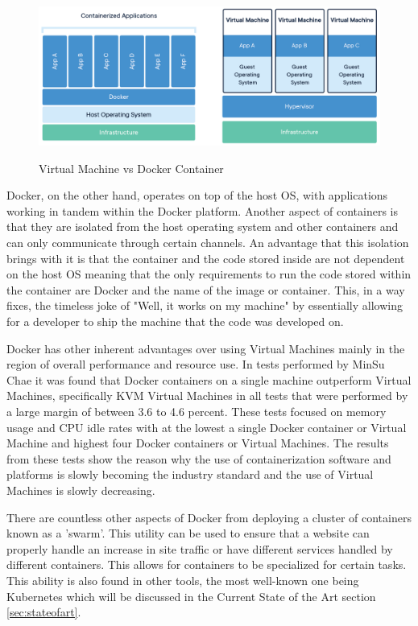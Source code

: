 \begin{figure}[h!]
    \centering
    \includegraphics[width=5in]{images/Docker1}
    \caption{Virtual Machine vs Docker Container}
    \cite{dockerContainer}
\end{figure}

Docker, on the other hand, operates on top of the host OS, with applications working in tandem within the Docker platform. Another aspect of containers is that they are isolated from the host operating system and other containers and can only communicate through certain channels. An advantage that this isolation brings with it is that the container and the code stored inside are not dependent on the host OS meaning that the only requirements to run the code stored within the container are Docker and the name of the image or container. This, in a way fixes, the timeless joke of "Well, it works on my machine" by essentially allowing for a developer to ship the machine that the code was developed on.

Docker has other inherent advantages over using Virtual Machines mainly in the region of overall performance and resource use. In tests performed by MinSu Chae \cite{chae2019performance} it was found that Docker containers on a single machine outperform Virtual Machines, specifically KVM Virtual Machines in all tests that were performed by a large margin of between 3.6 to 4.6 percent. These tests focused on memory usage and CPU idle rates with at the lowest a single Docker container or Virtual Machine and highest four Docker containers or Virtual Machines. The results from these tests show the reason why the use of containerization software and platforms is slowly becoming the industry standard and the use of Virtual Machines is slowly decreasing.

There are countless other aspects of Docker from deploying a cluster of containers known as a 'swarm'. This utility can be used to ensure that a website can properly handle an increase in site traffic or have different services handled by different containers. This allows for containers to be specialized for certain tasks. This ability is also found in other tools, the most well-known one being Kubernetes which will be discussed in the Current State of the Art section \ref{sec:stateofart}.


